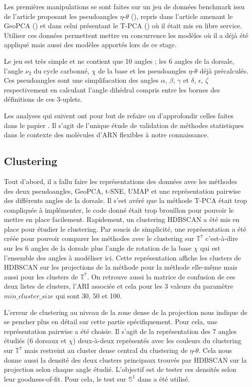 \documentclass[a4paper,12pt]{article}
\begin{document}
Les premières manipulations se sont faites sur un jeu de données benchmark issu de l'article proposant les pseudoangles $\eta$-$\theta$ (\cite{wadleyEvaluatingLearningRNA2007}), repris dans l'article amenant le GeoPCA (\cite{sargsyanGeoPCANewTool2012}) et dans celui présentant le T-PCA (\cite{eltznerTorusPrincipalComponent2018}) où il était mis en libre service. Utiliser ces données permettent mettre en concurrence les modèles où il a déjà été appliqué mais aussi des modèles apportés lors de ce stage.

Le jeu est très simple et ne contient que 10 angles ; les 6 angles de la dorsale, l'angle $\nu_2$ du cycle carbonné, $\chi$ de la base et les pseudoangles $\eta$-$\theta$ déjà précalculés. Ces pseudoangles sont une simplifacation des angles $\alpha$, $\beta$, $\gamma$ et $\delta$, $\epsilon$, $\zeta$ respectivement en calculant l'angle dihédral compris entre les bornes des définitions de ces 3-uplets.

Les analyses qui suivent ont pour but de refaire ou d'approfondir celles faites dans le papier \cite{wadleyEvaluatingLearningRNA2007}. Il s'agit de l'unique étude de validation de méthodes statistiques dans le contexte des molécules d'ARN flexibles à notre connaissance.

\subsection{Clustering}
Tout d'abord, il a fallu faire les représentations des données avec les méthodes des deux pseudoangles, GeoPCA, t-SNE, UMAP et une représentation pairwise des différents angles de la dorsale. Il s'est avéré que la méthode T-PCA était trop compliquée à implémenter, le code donné était trop brouillon pour pouvoir le mettre en place facilement. Rapidement, un clustering HDBSCAN a été mis en place pour étudier le clustering. Par soucis de simplicité, une représentation a été créée pour pouvoir comparer les méthodes avec le clustering sur $\mathbb{T}^7$ c'est-à-dire sur les 6 angles de la dorsale plus l'angle de rotation de la base $\chi$ qui est l'ensemble des angles à modéliser ici. Cette représentation affiche les clusters de HDBSCAN sur les projections de la méthode pour la méthode elle-même mais aussi pour les clusters de $\mathbb{T}^7$. On retrouve aussi la matrice de confusion de ces deux listes de clusters, l'ARI associée et cela pour les 3 valeurs du paramètre $min\_cluster\_size$ qui sont 30, 50 et 100.

L'erreur de clustering au niveau de la zone dense de la projection nous indique de se pencher plus en détail sur cette partie spécifiquement. Pour cela, une représentation pairwise a été choisie. Il s'agit de la représentation des 7 angles étudiés (6 dorsaux et $\chi$) deux-à-deux représentés avec les couleurs du clustering sur $\mathbb{T}^7$ mais restreint au cluster dense central du clustering de $\eta$-$\theta$. Cela nous donne aussi la densité des deux clusters principaux trouvés par HDBSCAN sur la projection selon chaque angle étudié. L'objectif est de tester ces densités selon leur goodness-of-fit. Pour cela, le test sur $\mathbb{S}^1$ dans \cite{gonzalez-delgadoTwosampleGoodnessoffitTests2023} a été utilisé.
\end{document}
